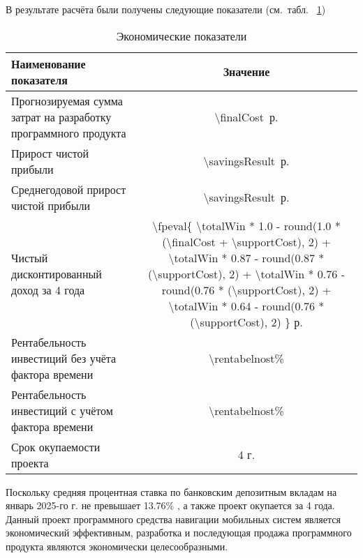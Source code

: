 В результате расчёта были получены следующие показатели (см.~табл.~
\bgroup
\def\arraystretch{1.2}
\ref{table:hehelastone})
	\begin{longtable}{|p{10cm}|c|}
		\caption{Экономические показатели}  \label{table:hehelastone} \\
		\hline
		Наименование показателя
		& Значение
		\\ \hline

		Прогнозируемая сумма затрат на разработку программного продукта
		& \num{\finalCost}~р.
		\\ \hline

		Прирост чистой прибыли
		& \num{\savingsResult}~р.
		\\ \hline

		Среднегодовой  прирост чистой прибыли
		& \num{\savingsResult}~р.
		\\ \hline

		Чистый дисконтированный доход за 4 года
		& \num{\fpeval{
			\totalWin * 1.0  -  round(1.0 * (\finalCost + \supportCost), 2) +
			\totalWin * 0.87 -  round(0.87 * (\supportCost), 2) +
			\totalWin * 0.76 -  round(0.76 * (\supportCost), 2) +
			\totalWin * 0.64 -  round(0.76 * (\supportCost), 2) 
		}} р.
		\\ \hline

		Рентабельность инвестиций без учёта фактора времени
		& \num{\rentabelnost}\%
		\\ \hline

		Рентабельность инвестиций с учётом фактора времени
		& \num{\rentabelnost}\%
		\\ \hline

		Срок окупаемости проекта
		& \num{4} г.
		\\ \hline

	\end{longtable}
\egroup



Поскольку средняя процентная ставка по банковским депозитным вкладам на
январь 2025-го г. не превышает \num{13.76}\% \cite{nbrb2025}, а также проект
окупается за 4 года.  Данный проект программного средства навигации мобильных
систем является экономический эффективным, разработка и последующая продажа программного продукта являются
экономически целесообразными.


\renewcommand{\bibsection}{\sectioncentered*{Список использованной литературы}}


